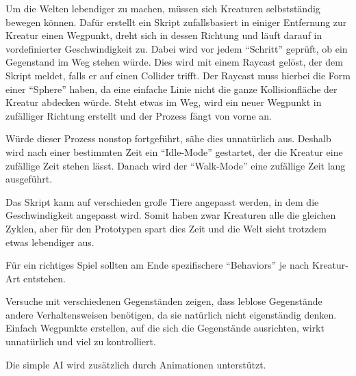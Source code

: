 
Um die Welten lebendiger zu machen, müssen sich Kreaturen selbstständig bewegen können. Dafür erstellt ein Skript zufallsbasiert in einiger Entfernung zur Kreatur einen Wegpunkt, dreht sich in dessen Richtung und läuft darauf in vordefinierter Geschwindigkeit zu. Dabei wird vor jedem \enquote{Schritt} geprüft, ob ein Gegenstand im Weg stehen würde. Dies wird mit einem Raycast gelöst, der dem Skript meldet, falls er auf einen Collider trifft. Der Raycast muss hierbei die Form einer \enquote{Sphere} haben, da eine einfache Linie nicht die ganze Kollisionfläche der Kreatur abdecken würde. Steht etwas im Weg, wird ein neuer Wegpunkt in zufälliger Richtung erstellt und der Prozess fängt von vorne an.

Würde dieser Prozess nonstop fortgeführt, sähe dies unnatürlich aus. Deshalb wird nach einer bestimmten Zeit ein \enquote{Idle-Mode} gestartet, der die Kreatur eine zufällige Zeit stehen lässt. Danach wird der \enquote{Walk-Mode} eine zufällige Zeit lang ausgeführt.

Das Skript kann auf verschieden große Tiere angepasst werden, in dem die Geschwindigkeit angepasst wird. Somit haben zwar Kreaturen alle die gleichen Zyklen, aber für den Prototypen spart dies Zeit und die Welt sieht trotzdem etwas lebendiger aus.

Für ein richtiges Spiel sollten am Ende spezifischere \enquote{Behaviors} je nach Kreatur-Art entstehen.

Versuche mit verschiedenen Gegenständen zeigen, dass leblose Gegenstände andere Verhaltensweisen benötigen, da sie natürlich nicht eigenständig denken. Einfach Wegpunkte erstellen, auf die sich die Gegenstände ausrichten, wirkt unnatürlich und viel zu kontrolliert.

Die simple AI wird zusätzlich durch Animationen unterstützt.